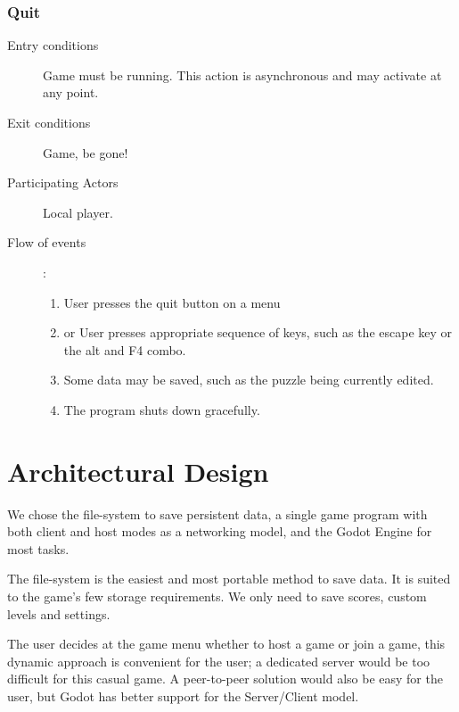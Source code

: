 \documentclass[12pt]{article}
\begin{document}
\begin{mdframed}
    \subsubsection{Quit}
    \begin{description}
        \item[Entry conditions] Game must be running. This action is
            asynchronous and may activate at any point.
        \item[Exit conditions] Game, be gone!
        \item[Participating Actors] Local player.
        \item[Flow of events]:
            \begin{enumerate}
                \item User presses the quit button on a menu
                \item or User presses appropriate sequence of keys, such as
                    the escape key or the alt and F4 combo.
                \item Some data may be saved, such as the puzzle being currently
                edited.
                \item The program shuts down gracefully.
            \end{enumerate}
    \end{description}
\end{mdframed}



\section{Architectural Design}

We chose the file-system to save persistent data, a single game program with
both client and host modes as a networking model, and the Godot Engine for most tasks.

The file-system is the easiest and most portable method to save data. It is
suited to the game's few storage requirements. We only need to save scores,
custom levels and settings.

The user decides at the game menu whether to host a game or join a game, this
dynamic approach is convenient for the user; a dedicated server
would be too difficult for this casual game. A peer-to-peer solution would
also be easy for the user, but Godot has better support for the Server/Client
model.
\end{document}
